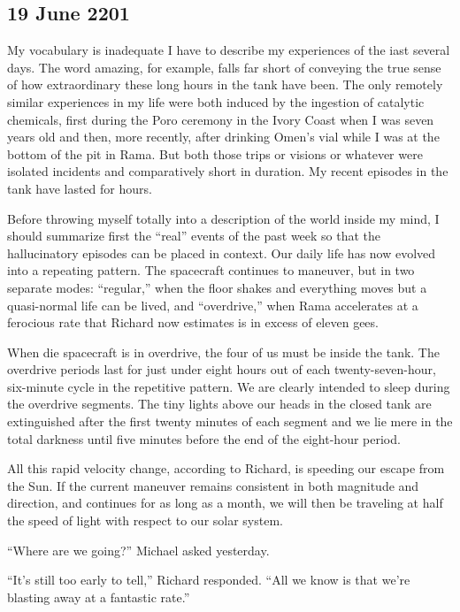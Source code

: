 \documentclass[]{article}
\begin{document}
\subsection*{19 June 2201}

My vocabulary is inadequate I have to describe my experiences of the iast several days.  The word amazing, for example, falls far short of conveying the true sense of how extraordinary these long hours in the tank have been.  The only remotely similar experiences in my life were both induced by the ingestion of catalytic chemicals, first during the Poro ceremony in the Ivory Coast when I was seven years old and then, more recently, after drinking Omen’s vial while I was at the bottom of the pit in Rama.  But both those trips or visions or whatever were isolated incidents and comparatively short in duration.  My recent episodes in the tank have lasted for hours.

Before throwing myself totally into a description of the world inside my mind, I should summarize first the “real” events of the past week so that the hallucinatory episodes can be placed in context.  Our daily life has now evolved into a repeating pattern.  The spacecraft continues to maneuver, but in two separate modes: “regular,” when the floor shakes and everything moves but a quasi-normal life can be lived, and “overdrive,” when Rama accelerates at a ferocious rate that Richard now estimates is in excess of eleven gees.

When die spacecraft is in overdrive, the four of us must be inside the tank.  The overdrive periods last for just under eight hours out of each twenty-seven-hour, six-minute cycle in the repetitive pattern.  We are clearly intended to sleep during the overdrive segments.  The tiny lights above our heads in the closed tank are extinguished after the first twenty minutes of each segment and we lie mere in the total darkness until five minutes before the end of the eight-hour period.

All this rapid velocity change, according to Richard, is speeding our escape from the Sun.  If the current maneuver remains consistent in both magnitude and direction, and continues for as long as a month, we will then be traveling at half the speed of light with respect to our solar system.

“Where are we going?” Michael asked yesterday.

“It’s still too early to tell,” Richard responded.  “All we know is that we’re blasting away at a fantastic rate.”
\end{document}
